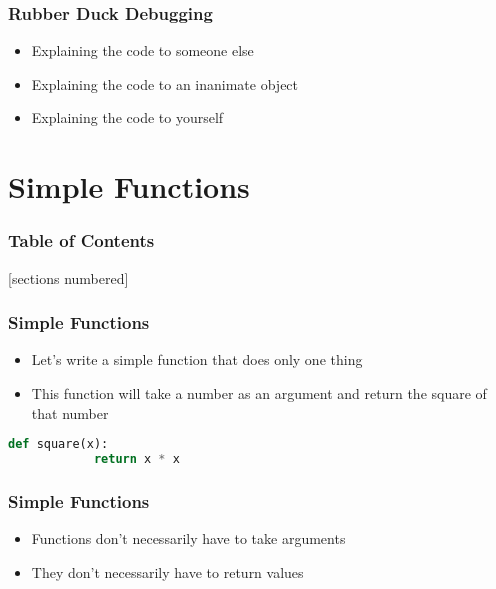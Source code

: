\documentclass[serif, 9pt, aspectratio=32]{beamer}
\begin{document}
\begin{frame}
    \centering
    \frametitle{Rubber Duck Debugging}
    \begin{itemize}
        \setlength{\itemsep}{3em}
        \item Explaining the code to someone else
        \item Explaining the code to an inanimate object
        \item Explaining the code to yourself
    \end{itemize}
\end{frame}

\section{Simple Functions}

\begin{frame}
    \frametitle{Table of Contents}
    [sections numbered]
    \tableofcontents[currentsection]
\end{frame}

\begin{frame}
    \centering
    \frametitle{Simple Functions}
    \begin{itemize}
        \setlength{\itemsep}{3em}
        \item Let's write a simple function that does only one thing
        \item This function will take a number as an argument and return the square of that number
    \end{itemize}
\end{frame}

\begin{frame}[fragile]
    \begin{lstlisting}[language=Python]
        def square(x):
            return x * x
    \end{lstlisting}
\end{frame}

\begin{frame}
    \centering
    \frametitle{Simple Functions}
    \begin{itemize}
        \setlength{\itemsep}{3em}
        \item Functions don't necessarily have to take arguments
        \item They don't necessarily have to return values
    \end{itemize}
\end{frame}
\end{document}
